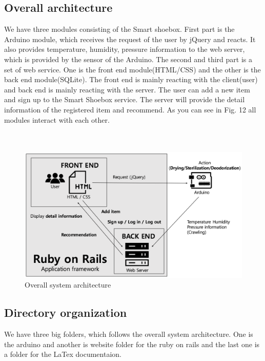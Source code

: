\documentclass[conference]{IEEEtran}
\begin{document}
\subsection{Overall architecture} We have three modules consisting of the Smart shoebox. First part is the Arduino module, which receives the request of the user by jQuery and reacts. It also provides temperature, humidity, pressure information to the web server, which is provided by the sensor of the Arduino. The second and third part is a set of web service. One is the front end module(HTML/CSS) and the other is the back end module(SQLite). The front end is mainly reacting with the client(user) and back end is mainly reacting with the server. The user can add a new item and sign up to the Smart Shoebox service. The server will provide the detail information of the registered item and recommend. As you can see in Fig. 12 all modules interact with each other. 
\\
\\
\\
\begin{figure}[h]
\begin{center}
    \includegraphics[scale=0.32]{overallarchitecture}
   \caption{Overall system architecture}\label{fig:label}
\end{center}
\end{figure}
\subsection{Directory organization}
We have three big folders, which follows the overall system architecture. One is the arduino and another is website folder for the ruby on rails and the last one is a folder for the LaTex documentaion.
\\
\end{document}
